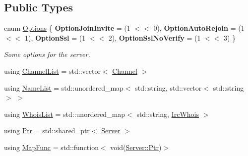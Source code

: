 \subsection*{Public Types}
\begin{DoxyCompactItemize}
\item 
enum \hyperlink{a00055_ae9b6c4babf5e31a565b9dc684e6a3483}{Options} \{ {\bfseries Option\-Join\-Invite} = (1 $<$$<$ 0), 
{\bfseries Option\-Auto\-Rejoin} = (1 $<$$<$ 1), 
{\bfseries Option\-Ssl} = (1 $<$$<$ 2), 
{\bfseries Option\-Ssl\-No\-Verify} = (1 $<$$<$ 3)
 \}
\begin{DoxyCompactList}\small\item\em Some options for the server. \end{DoxyCompactList}\item 
using \hyperlink{a00055_aa6c9af0cbeeb89dc0b4ea278ffacaecf}{Channel\-List} = std\-::vector$<$ \hyperlink{a00004}{Channel} $>$
\item 
using \hyperlink{a00055_ada7323736e755db49c77793a3aa768a3}{Name\-List} = std\-::unordered\-\_\-map$<$ std\-::string, std\-::vector$<$ std\-::string $>$ $>$
\item 
using \hyperlink{a00055_afddae57f2e12d80ef49128c82c5aca97}{Whois\-List} = std\-::unordered\-\_\-map$<$ std\-::string, \hyperlink{a00036}{Irc\-Whois} $>$
\item 
using \hyperlink{a00055_aea3f9694df81348b909814ac6f84f874}{Ptr} = std\-::shared\-\_\-ptr$<$ \hyperlink{a00055}{Server} $>$
\item 
using \hyperlink{a00055_a1f98346943a3940d8ef973d4816a6b46}{Map\-Func} = std\-::function$<$ void(\hyperlink{a00055_aea3f9694df81348b909814ac6f84f874}{Server\-::\-Ptr})$>$
\end{DoxyCompactItemize}
